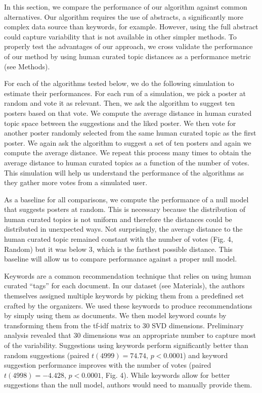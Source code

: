 \documentclass[a4paper]{article}
\begin{document}
In this section, we compare the performance of our algorithm against common alternatives. Our algorithm requires the use of abstracts, a significantly more complex data source than keywords, for example. However, using the full abstract could capture variability that is not available in other simpler methods. To properly test the advantages of our approach, we cross validate the performance of our method by using human curated topic distances as a performance metric (see Methods).

For each of the algorithms tested below, we do the following simulation to estimate their performances. For each run of a simulation, we pick a poster at random and vote it as relevant. Then, we ask the algorithm to suggest ten posters based on that vote. We compute the average distance in human curated topic space between the suggestions and the liked poster. We then vote for another poster randomly selected from the same human curated topic as the first poster. We again ask the algorithm to suggest a set of ten posters and again we compute the average distance. We repeat this process many times to obtain the average distance to human curated topics as a function of the number of votes. This simulation will help us understand the performance of the algorithms as they gather more votes from a simulated user.

As a baseline for all comparisons, we compute the performance of a null model that suggests posters at random. This is necessary because the distribution of human curated topics is not uniform and therefore the distances could be distributed in unexpected ways. Not surprisingly, the average distance to the human curated topic remained constant with the number of votes (Fig. 4, Random) but it was below 3, which is the farthest possible distance. This baseline will allow us to compare performance against a proper null model.

Keywords are a common recommendation technique that relies on using human curated “tags” for each document. In our dataset (see Materials), the authors themselves assigned multiple keywords by picking them from a predefined set crafted by the organizers. We used these keywords to produce recommendations by simply using them as documents. We then model keyword counts by transforming them from the tf-idf matrix to 30 SVD dimensions. Preliminary analysis revealed that 30 dimensions was an appropriate number to capture most of the variability. Suggestions using keywords perform significantly better than random suggestions (paired $t(4999) = 74.74$, $p < 0.0001$) and keyword suggestion performance improves with the number of votes (paired $t(4998) = -4.428$, $p < 0.0001$, Fig. 4). While keywords allow for better suggestions than the null model, authors would need to manually provide them.
\end{document}
